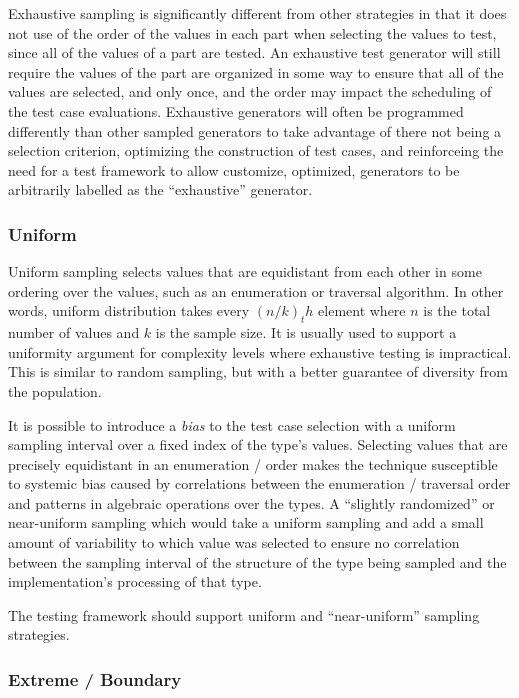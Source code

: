 Exhaustive sampling is significantly different from other strategies
in that it does not use of the order of the values in each part when
selecting the values to test, since all of the values of a part are tested.
An exhaustive test generator will still require the values of the part are organized in some way
to ensure that all of the values are selected, and only once,
and the order may impact the scheduling of the test case evaluations.
Exhaustive generators will often be programmed differently than other sampled generators
to take advantage of there not being a selection criterion,
optimizing the construction of test cases,
and reinforceing the need for a test framework to allow customize, optimized, generators
to be arbitrarily labelled as the ``exhaustive'' generator.

\subsubsection{Uniform}

Uniform sampling selects values that are equidistant from each other
in some ordering over the values, such as an enumeration or traversal algorithm.
In other words, uniform distribution takes every $ (n / k)_th $ element where
$n$ is the total number of values and $ k $ is the sample size.
It is usually used to support a uniformity argument
for complexity levels where exhaustive testing is impractical.
This is similar to random sampling,
but with a better guarantee of diversity from the population.

It is possible to introduce a \emph{bias} to the test case selection
with a uniform sampling interval over a fixed index of the type's values.
Selecting values that are precisely equidistant in an enumeration / order
makes the technique susceptible to systemic bias caused by correlations between
the enumeration / traversal order and patterns in algebraic operations over the types.
A ``slightly randomized'' or near-uniform sampling which 
would take a uniform sampling and add 
a small amount of variability to which value was selected to ensure 
no correlation between the sampling interval of the structure of the type being sampled
and the implementation's processing of that type.

The testing framework should support uniform and ``near-uniform'' sampling strategies.

\subsubsection{ Extreme / Boundary}


